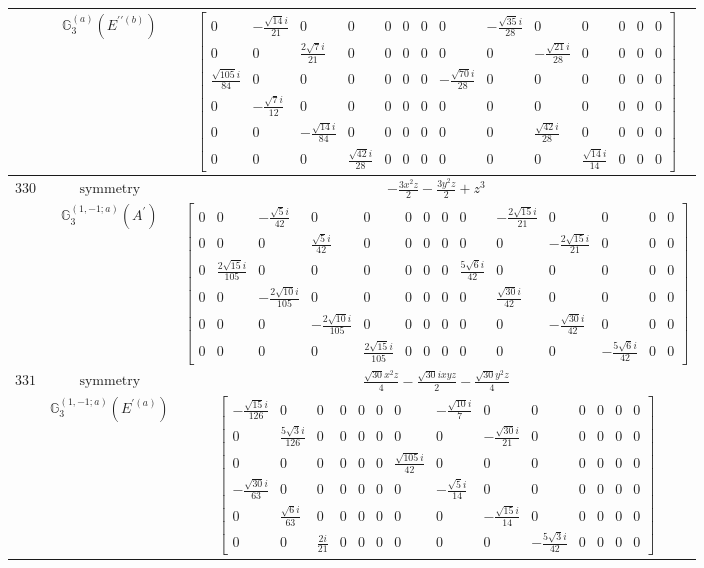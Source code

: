 \documentclass[fleqn,8pt,landscape]{jsarticle}
\begin{document}
\begin{longtable}{ccc}
$  $ & $ \mathbb{G}_{3}^{(a)}(E^{\prime\prime(b)}) $ & $ \begin{bmatrix} 0 & - \frac{\sqrt{14} i}{21} & 0 & 0 & 0 & 0 & 0 & 0 & - \frac{\sqrt{35} i}{28} & 0 & 0 & 0 & 0 & 0 \\ 0 & 0 & \frac{2 \sqrt{7} i}{21} & 0 & 0 & 0 & 0 & 0 & 0 & - \frac{\sqrt{21} i}{28} & 0 & 0 & 0 & 0 \\ \frac{\sqrt{105} i}{84} & 0 & 0 & 0 & 0 & 0 & 0 & - \frac{\sqrt{70} i}{28} & 0 & 0 & 0 & 0 & 0 & 0 \\ 0 & - \frac{\sqrt{7} i}{12} & 0 & 0 & 0 & 0 & 0 & 0 & 0 & 0 & 0 & 0 & 0 & 0 \\ 0 & 0 & - \frac{\sqrt{14} i}{84} & 0 & 0 & 0 & 0 & 0 & 0 & \frac{\sqrt{42} i}{28} & 0 & 0 & 0 & 0 \\ 0 & 0 & 0 & \frac{\sqrt{42} i}{28} & 0 & 0 & 0 & 0 & 0 & 0 & \frac{\sqrt{14} i}{14} & 0 & 0 & 0 \end{bmatrix} $ \\ \hline
$ 330 $ & $ \text{symmetry} $ & $ - \frac{3 x^{2} z}{2} - \frac{3 y^{2} z}{2} + z^{3} $ \\
$  $ & $ \mathbb{G}_{3}^{(1,-1;a)}(A^{\prime}) $ & $ \begin{bmatrix} 0 & 0 & - \frac{\sqrt{5} i}{42} & 0 & 0 & 0 & 0 & 0 & 0 & - \frac{2 \sqrt{15} i}{21} & 0 & 0 & 0 & 0 \\ 0 & 0 & 0 & \frac{\sqrt{5} i}{42} & 0 & 0 & 0 & 0 & 0 & 0 & - \frac{2 \sqrt{15} i}{21} & 0 & 0 & 0 \\ 0 & \frac{2 \sqrt{15} i}{105} & 0 & 0 & 0 & 0 & 0 & 0 & \frac{5 \sqrt{6} i}{42} & 0 & 0 & 0 & 0 & 0 \\ 0 & 0 & - \frac{2 \sqrt{10} i}{105} & 0 & 0 & 0 & 0 & 0 & 0 & \frac{\sqrt{30} i}{42} & 0 & 0 & 0 & 0 \\ 0 & 0 & 0 & - \frac{2 \sqrt{10} i}{105} & 0 & 0 & 0 & 0 & 0 & 0 & - \frac{\sqrt{30} i}{42} & 0 & 0 & 0 \\ 0 & 0 & 0 & 0 & \frac{2 \sqrt{15} i}{105} & 0 & 0 & 0 & 0 & 0 & 0 & - \frac{5 \sqrt{6} i}{42} & 0 & 0 \end{bmatrix} $ \\ \hline
$ 331 $ & $ \text{symmetry} $ & $ \frac{\sqrt{30} x^{2} z}{4} - \frac{\sqrt{30} i x y z}{2} - \frac{\sqrt{30} y^{2} z}{4} $ \\
$  $ & $ \mathbb{G}_{3}^{(1,-1;a)}(E^{\prime(a)}) $ & $ \begin{bmatrix} - \frac{\sqrt{15} i}{126} & 0 & 0 & 0 & 0 & 0 & 0 & - \frac{\sqrt{10} i}{7} & 0 & 0 & 0 & 0 & 0 & 0 \\ 0 & \frac{5 \sqrt{3} i}{126} & 0 & 0 & 0 & 0 & 0 & 0 & - \frac{\sqrt{30} i}{21} & 0 & 0 & 0 & 0 & 0 \\ 0 & 0 & 0 & 0 & 0 & 0 & \frac{\sqrt{105} i}{42} & 0 & 0 & 0 & 0 & 0 & 0 & 0 \\ - \frac{\sqrt{30} i}{63} & 0 & 0 & 0 & 0 & 0 & 0 & - \frac{\sqrt{5} i}{14} & 0 & 0 & 0 & 0 & 0 & 0 \\ 0 & \frac{\sqrt{6} i}{63} & 0 & 0 & 0 & 0 & 0 & 0 & - \frac{\sqrt{15} i}{14} & 0 & 0 & 0 & 0 & 0 \\ 0 & 0 & \frac{2 i}{21} & 0 & 0 & 0 & 0 & 0 & 0 & - \frac{5 \sqrt{3} i}{42} & 0 & 0 & 0 & 0 \end{bmatrix} $ \\ \hline

\end{longtable}
\end{document}
